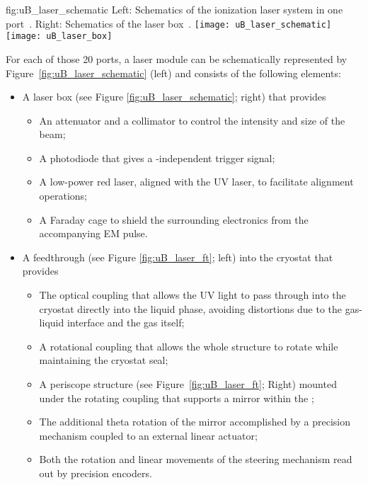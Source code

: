\begin{dunefigure}{fig:uB_laser_schematic}
{Left: Schematics of the ionization laser system in one port~\cite{Antonello:2015lea}. Right: Schematics of the laser box~\cite{microboone}.}
\texttt{[image: uB\_laser\_schematic]}
\texttt{[image: uB\_laser\_box]}
\end{dunefigure}



For each of those \num{20} ports, a laser module can be schematically represented by Figure~\ref{fig:uB_laser_schematic} (left) and consists of the following elements:
\begin{itemize}
    \item A laser box (see Figure \ref{fig:uB_laser_schematic}; right) that provides
    \begin{itemize}
        \item An attenuator and a collimator to control the intensity and size of the beam;
        \item A photodiode that gives a -independent trigger signal;
        \item A low-power red laser, aligned with the UV laser, to facilitate alignment operations;
        \item A Faraday cage to shield the surrounding electronics from the accompanying EM pulse.
    \end{itemize}
    \item A feedthrough (see Figure \ref{fig:uB_laser_ft}; left) into the cryostat that provides
    \begin{itemize}
        \item The optical coupling that allows the UV light to pass through into the cryostat directly into the liquid phase, avoiding distortions due to the gas-liquid interface and the gas itself;
        \item A rotational coupling that allows the whole structure to rotate while maintaining the cryostat seal;
        \item A periscope structure (see Figure~\ref{fig:uB_laser_ft}; Right) mounted under the rotating coupling that supports a mirror within the ;
        \item The additional theta rotation of the mirror accomplished by a precision mechanism coupled to an external linear actuator;
        \item Both the rotation and linear movements of the steering mechanism read out by precision encoders.
    \end{itemize}
    
\end{itemize}


